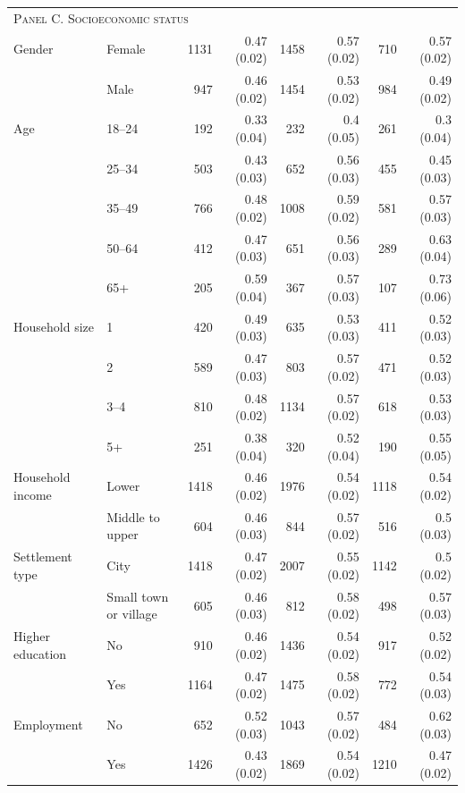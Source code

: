 \begin{tabular}{p{1.9in}p{1.5in}rrrrrr}
	\midrule
	\multicolumn{8}{l}{\textsc{Panel C. Socioeconomic status}} \\
	Gender & Female & 1131 & 0.47 (0.02) & 1458 & 0.57 (0.02) & 710 & 0.57 (0.02) \\ 
	& Male & 947 & 0.46 (0.02) & 1454 & 0.53 (0.02) & 984 & 0.49 (0.02) \\ 
		 	\addlinespace[4pt]
	Age & 18--24 & 192 & 0.33 (0.04) & 232 & 0.4 (0.05) & 261 & 0.3 (0.04) \\ 
	& 25--34 & 503 & 0.43 (0.03) & 652 & 0.56 (0.03) & 455 & 0.45 (0.03) \\ 
	& 35--49 & 766 & 0.48 (0.02) & 1008 & 0.59 (0.02) & 581 & 0.57 (0.03) \\ 
	& 50--64 & 412 & 0.47 (0.03) & 651 & 0.56 (0.03) & 289 & 0.63 (0.04) \\ 
	& 65+ & 205 & 0.59 (0.04) & 367 & 0.57 (0.03) & 107 & 0.73 (0.06) \\ 
		 	\addlinespace[4pt]
	Household size & 1 & 420 & 0.49 (0.03) & 635 & 0.53 (0.03) & 411 & 0.52 (0.03) \\ 
	& 2 & 589 & 0.47 (0.03) & 803 & 0.57 (0.02) & 471 & 0.52 (0.03) \\ 
	& 3--4 & 810 & 0.48 (0.02) & 1134 & 0.57 (0.02) & 618 & 0.53 (0.03) \\ 
	& 5+ & 251 & 0.38 (0.04) & 320 & 0.52 (0.04) & 190 & 0.55 (0.05) \\
		 	\addlinespace[4pt] 
	Household income & Lower & 1418 & 0.46 (0.02) & 1976 & 0.54 (0.02) & 1118 & 0.54 (0.02) \\ 
	& Middle to upper & 604 & 0.46 (0.03) & 844 & 0.57 (0.02) & 516 & 0.5 (0.03) \\ 
		 	\addlinespace[4pt]
	Settlement type & City & 1418 & 0.47 (0.02) & 2007 & 0.55 (0.02) & 1142 & 0.5 (0.02) \\ 
	& Small town or village & 605 & 0.46 (0.03) & 812 & 0.58 (0.02) & 498 & 0.57 (0.03) \\ 
		 	\addlinespace[4pt]
	Higher education & No & 910 & 0.46 (0.02) & 1436 & 0.54 (0.02) & 917 & 0.52 (0.02) \\ 
	& Yes & 1164 & 0.47 (0.02) & 1475 & 0.58 (0.02) & 772 & 0.54 (0.03) \\  
		 	\addlinespace[4pt]
	Employment & No & 652 & 0.52 (0.03) & 1043 & 0.57 (0.02) & 484 & 0.62 (0.03) \\ 
	& Yes & 1426 & 0.43 (0.02) & 1869 & 0.54 (0.02) & 1210 & 0.47 (0.02) \\ 
	

\end{tabular}
